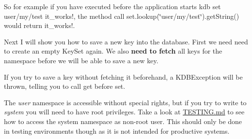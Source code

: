\begin{DoxyCode}{0}
\end{DoxyCode}


So for example if you have executed before the application starts {\ttfamily kdb set user/my/test it\+\_\+works!}, the method call {\ttfamily set.\+lookup(\char`\"{}user/my/test\char`\"{}).get\+String()} would return {\ttfamily it\+\_\+works!}.

Next I will show you how to save a new key into the database. First we need need to create an empty {\ttfamily Key\+Set} again. We also {\bfseries{need to fetch}} all keys for the namespace before we will be able to save a new key.


\begin{DoxyCode}{0}
\end{DoxyCode}


If you try to save a key without fetching it beforehand, a {\ttfamily K\+D\+B\+Exception} will be thrown, telling you to call get before set.

The {\itshape user} namespace is accessible without special rights, but if you try to write to {\itshape system} you will need to have root privileges. Take a look at \mbox{\hyperlink{doc_TESTING_md}{T\+E\+S\+T\+I\+NG.md}} to see how to access the system namespace as non-\/root user. This should only be done in testing environments though as it is not intended for productive systems.



